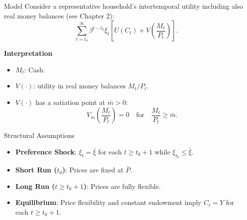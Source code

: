\documentclass[11pt,aspectratio=169]{beamer}
\begin{document}
\begin{frame}{Model}
\small
Consider a representative household's intertemporal utility including also real money balances (see Chapter 2):
\begin{equation*}
\sum_{t=t_{0}}^{\infty }\beta ^{t-t_{0}}\xi _{t}\left[ U(C_{t}) + V\left( \frac{M_{t}}{P_{t}} \right) \right]. 
\end{equation*}


\textbf{Interpretation}
\begin{itemize}
    \item $M_t$: Cash.
    \item $V(\cdot)$: utility in real money balances $M_t/P_t$.
    \item $V(\cdot)$ has a satiation point at $\bar{m} > 0$:
    \begin{equation*}
    V_{m}\left( \frac{M_t}{P_t} \right) = 0 \quad \text{for} \quad \frac{M_t}{P_t} \geq \bar{m}.
    \end{equation*}
\end{itemize}
\end{frame}
\begin{frame}{Structural Assumptions}
\small
\begin{itemize}
    \item \textbf{Preference Shock}: $\xi _{t}=\bar{\xi}$ for each $t\geq t_{0}+1$ while $\xi _{t_{0}}\leq \bar{\xi}$.
    \vspace{0.25em}
    \item \textbf{Short Run ($t_0$)}: Prices are fixed at $\bar{P}$.
    \vspace{0.25em}
    \item \textbf{Long Run ($t \geq t_0+1$)}: Prices are fully flexible.
    \vspace{0.25em}
    \item \textbf{Equilibrium}: Price flexibility and constant endowment imply $C_{t}=Y$ for each $t\geq t_{0}+1$.
\end{itemize}

\end{frame}
\end{document}
